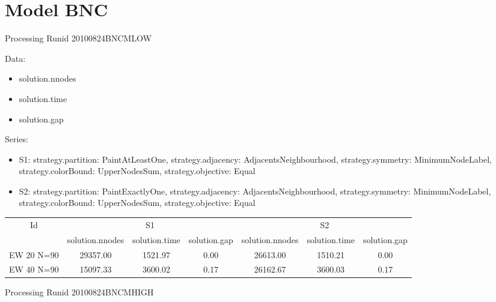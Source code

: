 \documentclass[landscape, 12pt]{report}
\begin{document}
	
	\clearpage
	
	
	\section{Model BNC}
	
	Processing Runid 20100824BNCMLOW

Data:
\begin{itemize}
\item solution.nnodes
\item solution.time
\item solution.gap
\end{itemize}
Series:
\begin{itemize}
\item S1: strategy.partition: PaintAtLeastOne, strategy.adjacency: AdjacentsNeighbourhood, strategy.symmetry: MinimumNodeLabel, strategy.colorBound: UpperNodesSum, strategy.objective: Equal
\item S2: strategy.partition: PaintExactlyOne, strategy.adjacency: AdjacentsNeighbourhood, strategy.symmetry: MinimumNodeLabel, strategy.colorBound: UpperNodesSum, strategy.objective: Equal
\end{itemize}
\begin{tabular}{|c|ccc|ccc|}
\hline
\multicolumn{1}{|c|}{Id} & \multicolumn{3}{|c|}{S1} & \multicolumn{3}{|c|}{S2}
\\
 & solution.nnodes & solution.time & solution.gap & solution.nnodes & solution.time & solution.gap
\\
\hline
EW 20 N=90 & 29357.00 & 1521.97 & 0.00 & 26613.00 & 1510.21 & 0.00
\\
EW 40 N=90 & 15097.33 & 3600.02 & 0.17 & 26162.67 & 3600.03 & 0.17
\\
\hline 
 \end{tabular}

Processing Runid 20100824BNCMHIGH
\end{document}
